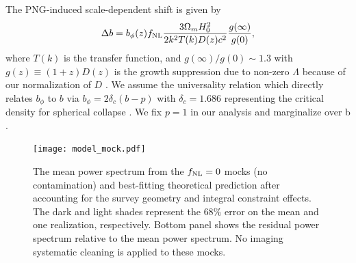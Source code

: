  The PNG-induced scale-dependent shift is given by \citep{slosar2008constraints}
\begin{equation}
\Delta b = b_{\phi}(z) f_{\rm NL} \frac{3 \Omega_{m} H^{2}_{0}}{2 k^{2}T(k)D(z) c^{2}} \frac{g(\infty)}{g(0)},
\label{eq:scaledepbias}
\end{equation}
where $T(k)$ is the transfer function, and $g(\infty)/g(0) \sim 1.3$ with $g(z)\equiv (1+z) D(z)$ is the growth suppression due to non-zero $\Lambda$ because of our normalization of $D$ \citep[see, e.g.,][]{2010JCAP...07..013R, 2019MNRAS.485.4160M}. We assume the universality relation which directly relates $b_\phi$ to $b$ via $b_{\phi} = 2 \delta_{c}(b - p)$ with $\delta_{c}= 1.686$ representing the critical density for spherical collapse \citep{fillmore1984self}. We fix $p=1$ in our analysis and marginalize over b \citep[see, also,][]{slosar2008constraints,2010JCAP...07..013R,2013MNRAS.428.1116R}. 

\begin{figure}
\centering
\texttt{[image: model\_mock.pdf]}
\caption{The mean power spectrum from the $f_{\rm NL}=0$ mocks (no contamination) and best-fitting theoretical prediction after accounting for the survey geometry and integral constraint effects. The dark and light shades represent the $68\%$ error on the mean and one realization, respectively. Bottom panel shows the residual power spectrum relative to the mean power spectrum. No imaging systematic cleaning is applied to these mocks.}\label{fig:model_mock}
\end{figure}

